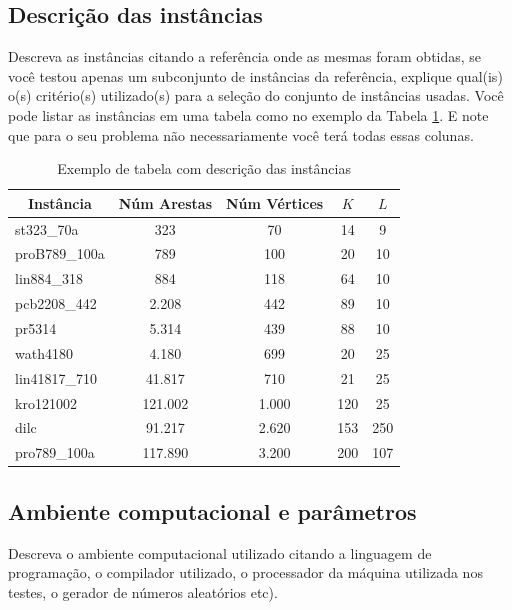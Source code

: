 \documentclass[12pt]{article}
\begin{document}
\subsection{Descrição das instâncias}
\label{subSecInstancias}
Descreva as instâncias citando a referência onde as mesmas foram obtidas, se você testou apenas um subconjunto de instâncias da referência, explique qual(is) o(s) critério(s) utilizado(s) para a seleção do conjunto de instâncias usadas. Você pode listar as instâncias em uma tabela como no exemplo da Tabela \ref{tabInstancias}. E note que para o seu problema não necessariamente você terá todas essas colunas.

\begin{table}[!h]
\centering
\caption{Exemplo de tabela com descrição das instâncias}
\begin{tabular}{|l|c|c|c|c|}
\hline
\multicolumn{1}{|c|}{\textbf{Instância}} & \multicolumn{1}{c|}{\textbf{Núm Arestas}} & \multicolumn{1}{c|}{\textbf{Núm Vértices}} & \multicolumn{1}{c|}{\textbf{$K$}} & \multicolumn{1}{c|}{\textbf{$L$}}  \\ \hline
st323\_70a & 323 & 70 & 14 & 9   \\ \hline
proB789\_100a & 789 & 100 & 20 & 10  \\ \hline
lin884\_318 & 884 & 118 & 64 & 10   \\ \hline \hline
pcb2208\_442 & 2.208  & 442 & 89 & 10  \\ \hline
pr5314 & 5.314 & 439 & 88 & 10  \\ \hline
wath4180 & 4.180 & 699 & 20 & 25\\ \hline
lin41817\_710 & 41.817 & 710 & 21 & 25  \\ \hline \hline
kro121002 & 121.002 & 1.000 & 120 & 25  \\ \hline
dilc & 91.217 & 2.620 & 153 & 250  \\ \hline
pro789\_100a & 117.890 & 3.200 & 200 & 107  \\ \hline
\end{tabular}
\label{tabInstancias}
\end{table}


\subsection{Ambiente computacional e  parâmetros}
\label{subSecAmbiente}
Descreva o ambiente computacional utilizado citando a linguagem de programação, o compilador utilizado, o processador da máquina utilizada nos testes, o gerador de números aleatórios etc).
\end{document}
